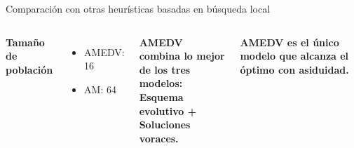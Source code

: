 \begin{frame}{\fontsize{14}{8}\selectfont Comparación con otras heurísticas basadas en búsqueda local}
\begin{columns}[c]
				
				\fontsize{8}{8}\selectfont
				
				\textbf{Tamaño de población}
				\begin{itemize}
					\item AMEDV: 16
					\item AM: 64 
				\end{itemize}
				
				\kern 3mm
				
				\fontsize{6}{8}\selectfont								
				\begin{tcolorbox}[colback=blue!5,colframe=blue!30]
					\color{blue!80} \textbf{AMEDV combina lo mejor de los tres modelos: \\ Esquema evolutivo + \\ Soluciones voraces.}
				\end{tcolorbox}

				\begin{tcolorbox}[colback=blue!5,colframe=blue!30]
					\color{blue!80} \textbf{AMEDV es el único modelo que alcanza el óptimo con asiduidad.}
				\end{tcolorbox}	
			\end{columns}
			
		\end{frame}
		
